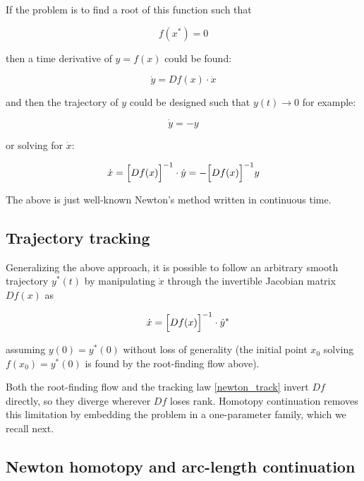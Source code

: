 \documentclass[11pt,american]{article}
\theoremstyle{definition}
\theoremstyle{plain}
\theoremstyle{remark}
\begin{document}
If the problem is to find a root of this function such that

\begin{equation}
f(x^*) = 0
\end{equation}

then a time derivative of $y = f(x)$ could be found:

\begin{equation}
\dot y = D f(x) \cdot \dot x
\end{equation}

and then the trajectory of $y$ could be designed such that $y(t) \to 0$ for example:

\begin{equation}
\dot y = -y
\end{equation}

or solving for $\dot x$:

\begin{equation}
\dot x = \Bigl[ D f(x) \Bigr]^{-1} \cdot \dot y = -\Bigl[ D f(x) \Bigr]^{-1} y
\end{equation}

The above is just well-known Newton's method written in continuous time.

\subsection{Trajectory tracking}

Generalizing the above approach, it is possible to follow an arbitrary smooth trajectory $y^*(t)$ by manipulating $\dot x$ through the invertible Jacobian matrix $D f(x)$ as 

\begin{equation}\label{newton_track}
\quad \dot x = \Bigl[ D f(x) \Bigr]^{-1} \cdot \dot y^*
\end{equation}

assuming $y(0) = y^*(0)$ without loss of generality (the initial point $x_0$ solving $f(x_0) = y^*(0)$ is found by the root-finding flow above).

Both the root-finding flow and the tracking law \eqref{newton_track} invert $Df$ directly, so they diverge wherever $Df$ loses rank. Homotopy continuation removes this limitation by embedding the problem in a one-parameter family, which we recall next.


\subsection{Newton homotopy and arc-length continuation}
\end{document}

